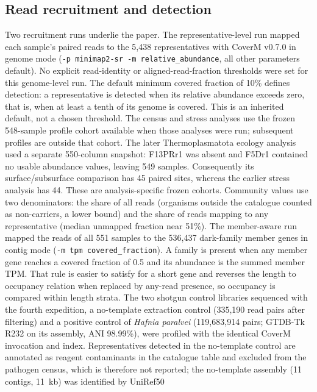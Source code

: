 \documentclass[11pt]{article}
\begin{document}
\subsection*{Read recruitment and detection}
Two recruitment runs underlie the paper. The representative-level run mapped each sample's paired
reads to the 5{,}438 representatives with CoverM v0.7.0 \citep{aroney2025coverm} in genome mode
(\texttt{-p minimap2-sr -m relative\_abundance}, all other parameters default). No explicit read-identity or aligned-read-fraction thresholds were set for this genome-level run. The default minimum
covered fraction of 10\% defines detection: a representative is detected when its relative abundance
exceeds zero, that is, when at least a tenth of its genome is covered. This is an inherited default,
not a chosen threshold. The census and stress analyses use the frozen 548-sample profile cohort available when those analyses were run; subsequent profiles are outside that cohort. The later Thermoplasmatota ecology analysis used a separate 550-column snapshot: F13PRr1 was absent and F5Dr1 contained no usable abundance values, leaving 549 samples. Consequently its surface/subsurface comparison has 45 paired sites, whereas the earlier stress analysis has 44. These are analysis-specific frozen cohorts. Community values use two denominators: the share of all reads (organisms outside
the catalogue counted as non-carriers, a lower bound) and the share of reads mapping to any
representative (median unmapped fraction near 51\%). The member-aware run mapped the reads of all 551
samples to the 536{,}437 dark-family member genes in contig mode (\texttt{-m tpm covered\_fraction}).
A family is present when any member gene reaches a covered fraction of 0.5 and its abundance is the
summed member TPM. That rule is easier to satisfy for a short gene and reverses the length to
occupancy relation when replaced by any-read presence, so occupancy is compared within length strata.
The two shotgun control libraries sequenced with the fourth expedition, a no-template extraction
control (335{,}190 read pairs after filtering) and a positive control of \emph{Hafnia paralvei}
(119{,}683{,}914 pairs; GTDB-Tk R232 on its assembly, ANI 98.99\%), were profiled with the identical
CoverM invocation and index. Representatives detected in the no-template control are annotated as
reagent contaminants in the catalogue table and excluded from the pathogen census, which is
therefore not reported; the no-template assembly (11 contigs, 11~kb) was identified by UniRef50
\end{document}
